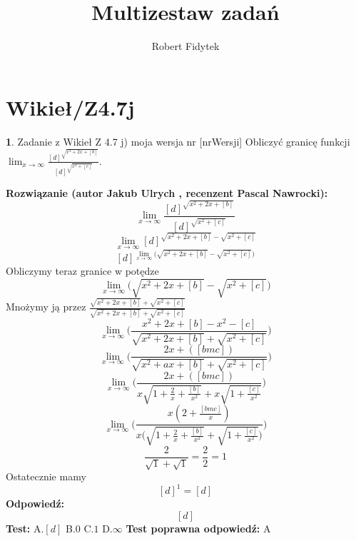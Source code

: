\documentclass[12pt, a4paper]{article}
\title{Multizestaw zadań}
\author{Robert Fidytek}
\date{}
\theoremstyle{definition} %
\newtheorem{zad}{}
\newcommand{\kategoria}[1]{\section{#1}} %
\newcommand{\zadStart}[1]{\begin{zad}#1\newline} %
\newcommand{\zadStop}{\end{zad}}   %
\newcommand{\rozwStart}[2]{\noindent \textbf{Rozwiązanie (autor #1 , recenzent #2): }\newline} %
\newcommand{\rozwStop}{\newline}                                            %
\newcommand{\odpStart}{\noindent \textbf{Odpowiedź:}\newline}    %
\newcommand{\odpStop}{\newline}                                             %
\newcommand{\testStart}{\noindent \textbf{Test:}\newline} %
\newcommand{\testStop}{\newline} %
\newcommand{\kluczStart}{\noindent \textbf{Test poprawna odpowiedź:}\newline} %
\newcommand{\kluczStop}{\newline} %
\begin{document}
\maketitle


\kategoria{Wikieł/Z4.7j}
\zadStart{Zadanie z Wikieł Z 4.7 j) moja wersja nr [nrWersji]}
Obliczyć granicę funkcji $\lim_{x \to \infty}\frac{[d]^{\sqrt{x^{2}+2x+[b]}}}{[d]^{\sqrt{x^{2}+[c]}}}$.
\zadStop
\rozwStart{Jakub Ulrych}{Pascal Nawrocki}
$$\lim_{x \to \infty}\frac{[d]^{\sqrt{x^{2}+2x+[b]}}}{[d]^{\sqrt{x^{2}+[c]}}}$$
$$\lim_{x \to \infty}[d]^{\sqrt{x^{2}+2x+[b]}-\sqrt{x^{2}+[c]}}$$
$$[d]^{\lim_{x \to \infty}\big(\sqrt{x^{2}+2x+[b]}-\sqrt{x^{2}+[c]}\big)}$$
Obliczymy teraz granice w potędze
$$\lim_{x \to \infty}\big(\sqrt{x^{2}+2x+[b]}-\sqrt{x^{2}+[c]}\big)$$
Mnożymy ją przez $\frac{\sqrt{x^{2}+2x+[b]}+\sqrt{x^{2}+[c]}}{\sqrt{x^{2}+2x+[b]}+\sqrt{x^{2}+[c]}}$
$$\lim_{x \to \infty}\bigg(\frac{x^{2}+2x+[b]-x^{2}-[c]}{\sqrt{x^{2}+2x+[b]}+\sqrt{x^{2}+[c]}}\bigg)$$
$$\lim_{x \to \infty}\bigg(\frac{2x+([bmc])}{\sqrt{x^{2}+ax+[b]}+\sqrt{x^{2}+[c]}}\bigg)$$
$$\lim_{x \to \infty}\bigg(\frac{2x+([bmc])}{x\sqrt{1+\frac{2}{x}+\frac{[b]}{x^{2}}}+x\sqrt{1+\frac{[c]}{x^{2}}}}\bigg)$$
$$\lim_{x \to \infty}\bigg(\frac{x(2+\frac{[bmc]}{x})}{x\big(\sqrt{1+\frac{2}{x}+\frac{[b]}{x^{2}}}+\sqrt{1+\frac{[c]}{x^{2}}}\big)}\bigg)$$
$$\frac{2}{\sqrt{1}+\sqrt{1}}=\frac{2}{2}=1$$
Ostatecznie mamy
$$[d]^{1}=[d]$$
\rozwStop
\odpStart
$$[d]$$
\odpStop
\testStart
A.$[d]$
B.$0$
C.$1$
D.$\infty$
\testStop
\kluczStart
A
\kluczStop
\end{document}
